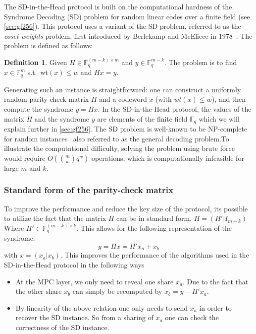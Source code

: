 \documentclass[twoside,11pt]{report}
\theoremstyle{definition}
\newtheorem{definition}{Definition}[section]
\theoremstyle{plain}
\begin{document}
The SD-in-the-Head protocol is built on the computational hardness of the Syndrome Decoding (SD) problem for random linear codes over a finite field (see \autoref{sec:gf256}). This protocol uses a variant of the SD problem, referred to as the \textit{coset weights} problem, first introduced by Berlekamp and McEliece in 1978~\cite{berlekamp1978inherent}. The problem is defined as follows:
\begin{definition}\label{def:syndrome}
  Given $H \in \mathbb{F}^{(m-k)\times m}_q$ and $y \in \mathbb{F}^{m-k}_q$. The problem is to find $x \in \mathbb{F}^m_q$ s.t.\ wt$(x) \leq w$ and $Hx = y$.
\end{definition}
Generating such an instance is straightforward: one can construct a uniformly random parity-check matrix $H$ and a codeword $x$ (with $wt(x) \leq w$), and then compute the syndrome $y = Hx$. In the SD-in-the-Head protocol, the values of the matrix $H$ and the syndrome $y$ are elements of the finite field $\mathbb{F}_q$ which we will explain further in \autoref{sec:gf256}. The SD problem is well-known to be NP-complete for random instances~\cite{berlekamp1978inherent} also referred to as the general decoding problem.To illustrate the computational difficulty, solving the problem using brute force would require $O(\binom{m}{w} q^w)$ operations, which is computationally infeasible for large $m$ and $k$.

\subsubsection{Standard form of the parity-check matrix}\label{sec:standard_form_of_the_parity_check_matrix}
To improve the performance and reduce the key size of the protocol, its possible to utilize the fact that the matrix $H$ can be in standard form. $H = (H'|I_{m-k}) $ Where $H' \in \mathbb{F}^{(m-k)\times k}_q$. This allows for the following representation of the syndrome:
\begin{equation}
  y = Hx = H'x_a + x_b\label{eq:standard_form_of_the_parity_check_matrix}
\end{equation}
with $x = (x_a | x_b)$. This improves the performance of the algorithms used in the SD-in-the-Head protocol in the following ways
\begin{itemize}
  \item At the MPC layer, we only need to reveal one share $x_a$. Due to the fact that the other share $x_b$ can simply be recomputed by $x_b = y - H'x_a$.
  \item By linearity of the above relation one only needs to send $x_a$ in order to recover the SD instance. So from a sharing of $x_a$ one can check the correctness of the SD instance.
\end{itemize}
\end{document}
